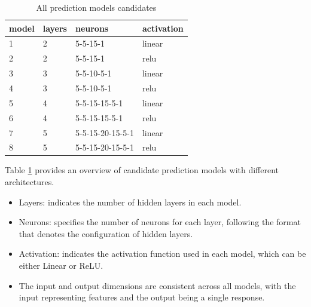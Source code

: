 \documentclass[manuscript,screen,review]{acmart}
\begin{document}
\begin{table}[h]
    \begin{tabular}{|l|l|l|l|}
    \hline
    \textbf{model} & \textbf{layers} & \textbf{neurons} & \textbf{activation} \\ \hline
    1              & 2                                    & 5-5-15-1         & linear              \\ \hline
    2              & 2                                    & 5-5-15-1         & relu                \\ \hline
    3              & 3                                    & 5-5-10-5-1       & linear              \\ \hline
    4              & 3                                    & 5-5-10-5-1       & relu                \\ \hline
    5              & 4                                    & 5-5-15-15-5-1    & linear              \\ \hline
    6              & 4                                    & 5-5-15-15-5-1    & relu                \\ \hline
    7              & 5                                    & 5-5-15-20-15-5-1 & linear              \\ \hline
    8              & 5                                    & 5-5-15-20-15-5-1 & relu                \\ \hline
\end{tabular}
\caption{All prediction models candidates}
\label{tab:model_options}
\end{table}

Table \ref{tab:model_options} provides an overview of candidate prediction models with different architectures.
\begin{itemize}
\item Layers: indicates the number of hidden layers in each model.
\item Neurons: specifies the number of neurons for each layer, following the format that denotes the configuration of hidden layers.
\item Activation:  indicates the activation function used in each model, which can be either Linear or ReLU.
\item The input and output dimensions are consistent across all models, with the input representing features and the output being a single response.
\end{itemize}
\end{document}
